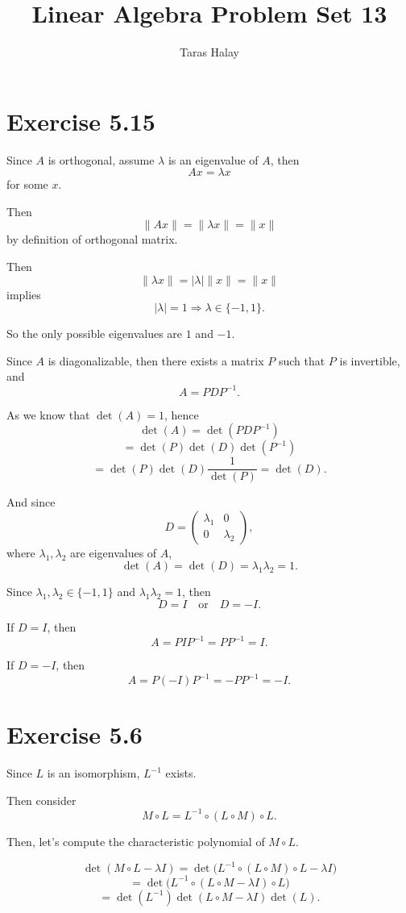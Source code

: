 \documentclass[11pt,a4paper]{article}
\title{Linear Algebra Problem Set 13}
\author{Taras Halay}
\date{}
\begin{document}
\maketitle

\section*{Exercise 5.15}

Since $A$ is orthogonal, assume $\lambda$ is an eigenvalue of $A$, then
\[
Ax=\lambda x
\]
for some $x$.

Then
\[
\|Ax\|=\|\lambda x\|=\|x\|
\]
by definition of orthogonal matrix.

Then
\[
\|\lambda x\|=|\lambda|\|x\|=\|x\|
\]
implies
\[
|\lambda|=1 \Rightarrow \lambda\in\{-1,1\}.
\]

So the only possible eigenvalues are $1$ and $-1$.

Since $A$ is diagonalizable, then there exists a matrix $P$ such that $P$ is invertible, and
\[
A=PDP^{-1}.
\]

As we know that $\det(A)=1$, hence
\[
\det(A)=\det(PDP^{-1})
\]
\[
=\det(P)\det(D)\det(P^{-1})
\]
\[
=\det(P)\det(D)\frac{1}{\det(P)}=\det(D).
\]

And since
\[
D=
\begin{pmatrix}
\lambda_1 & 0\\
0 & \lambda_2
\end{pmatrix},
\]
where $\lambda_1,\lambda_2$ are eigenvalues of $A$,
\[
\det(A)=\det(D)=\lambda_1\lambda_2=1.
\]

Since $\lambda_1,\lambda_2\in\{-1,1\}$ and $\lambda_1\lambda_2=1$, then
\[
D=I \quad \text{or} \quad D=-I.
\]

If $D=I$, then
\[
A=PIP^{-1}=PP^{-1}=I.
\]

If $D=-I$, then
\[
A=P(-I)P^{-1}=-PP^{-1}=-I.
\]

\section*{Exercise 5.6}

Since $L$ is an isomorphism, $L^{-1}$ exists.

Then consider
\[
M\circ L=L^{-1}\circ (L\circ M)\circ L.
\]

Then, let's compute the characteristic polynomial of $M\circ L$.

\[
\det(M\circ L-\lambda I)=
\det\bigl(L^{-1}\circ (L\circ M)\circ L-\lambda I\bigr)
\]
\[
=\det\bigl(L^{-1}\circ (L\circ M-\lambda I)\circ L\bigr)
\]
\[
=\det(L^{-1})\det(L\circ M-\lambda I)\det(L).
\]
\end{document}
